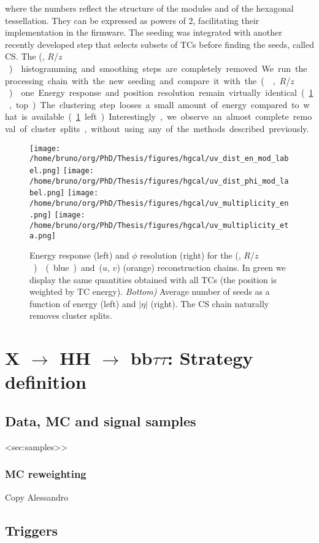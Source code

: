 \documentclass[11pt]{article}
\newcommand{\reshhbbtt}{X $\rightarrow$ HH $\rightarrow$ bb$\tau\tau$}
\newcommand{\coordsa}{(\si{\azi}, \si{\rz})}
\newcommand{\coordsb}{($u$, $v$)}
\newcommand{\rz}{$R$/$z$}
\begin{document}
\noindent where the numbers reflect the structure of the modules and of the hexagonal tessellation.
They can be expressed as powers of 2, facilitating their implementation in the firmware.
The seeding was integrated with another recently developed step that selects subsets of \acp{TC} before finding the seeds, called \ac{CS}.
The \coordsa{} histogramming and smoothing steps are completely removed.
We run the processing chain with the new seeding and compare it with the \coordsa{} one.
Energy response and position resolution remain virtually identical (\cref{fig:uv_dist}, top).
The clustering step looses a small amount of energy compared to what is available (\cref{fig:uv_dist} left).
Interestingly, we observe an almost complete removal of cluster splits, without using any of the methods described previously.

\begin{figure}
\texttt{[image: /home/bruno/org/PhD/Thesis/figures/hgcal/uv\_dist\_en\_mod\_label.png]}
\texttt{[image: /home/bruno/org/PhD/Thesis/figures/hgcal/uv\_dist\_phi\_mod\_label.png]}
\texttt{[image: /home/bruno/org/PhD/Thesis/figures/hgcal/uv\_multiplicity\_en.png]}
\texttt{[image: /home/bruno/org/PhD/Thesis/figures/hgcal/uv\_multiplicity\_eta.png]}
\caption{\label{fig:uv_dist}Energy response (left) and \(\phi\) resolution (right) for the \coordsa{} (blue) and \coordsb{} (orange) reconstruction chains. In green we display the same quantities obtained with all \acp{TC} (the position is weighted by \ac{TC} energy). \emph{Bottom)} Average number of seeds as a function of energy (left) and \(|\eta|\) (right). The CS chain naturally removes cluster splits.}
\end{figure}
\section{\reshhbbtt{}: Strategy definition}
\label{sec:org55acf68}
\label{sec::bbtautau}
\subsection{Data, MC and signal samples}
\label{sec:orgc0a0c05}
<sec:samples>>
\subsubsection{MC reweighting}
\label{sec:org21833f2}
Copy Alessandro
\subsection{Triggers}
\label{sec:org9d8e543}
\end{document}
